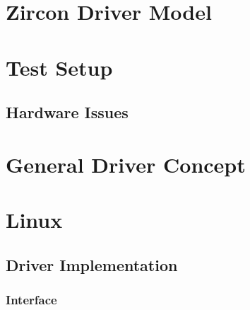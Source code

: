 \section{Zircon Driver Model}

\section{Test Setup}

\subsection{Hardware Issues}
%
%
%
%
%
%
%
%
%
%



\section{General Driver Concept}\label{sec:cs-driver-concept}


\section{Linux}\label{sec:cs-linux}


\subsection{Driver Implementation} %
\subsubsection{Interface} %
